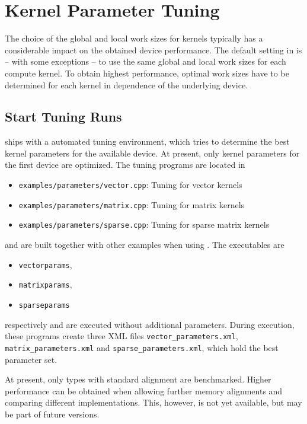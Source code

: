 \chapter{Kernel Parameter Tuning} \label{chap:tuning}
The choice of the global and local work sizes for {\OpenCL} kernels typically has a considerable impact on the obtained device performance.
The default setting in {\ViennaCL} is -- with some exceptions -- to use the same global and local work sizes for each compute kernel.
To obtain highest performance, optimal work sizes have to be determined for each kernel in dependence of the underlying device.

\section{Start Tuning Runs}
{\ViennaCLversion} ships with a automated tuning environment, which tries to determine the best kernel parameters for the available device.
At present, only kernel parameters for the first device are optimized. The tuning programs are located in
\begin{itemize}
 \item \texttt{examples/parameters/vector.cpp}: Tuning for vector kernels
 \item \texttt{examples/parameters/matrix.cpp}: Tuning for matrix kernels
 \item \texttt{examples/parameters/sparse.cpp}: Tuning for sparse matrix kernels
\end{itemize}
and are built together with other examples when using {\CMake}. The executables are
\begin{itemize}
 \item \texttt{vectorparams},
 \item \texttt{matrixparams},
 \item \texttt{sparseparams}
\end{itemize}
respectively and are executed without additional parameters.
During execution, these programs create three XML files \texttt{vector\_parameters.xml}, \texttt{matrix\_parameters.xml} and \texttt{sparse\_parameters.xml}, which hold the best parameter set.

At present, only {\ViennaCL} types with standard alignment are benchmarked. Higher performance can be obtained when allowing further memory alignments and comparing different implementations.
This, however, is not yet available, but may be part of future versions.

